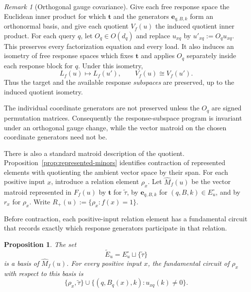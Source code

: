 \documentclass[11pt]{article}
\numberwithin{equation}{section}
\newtheorem{proposition}[definition]{Proposition}
\theoremstyle{remark}
\newtheorem{remark}[definition]{Remark}
\begin{document}
\begin{remark}[Orthogonal gauge covariance]
\label{rem:quotient-gauge-covariance}
Give each free response space the Euclidean inner product for which
$\mathbf t$ and the generators $\mathbf e_{q,B,k}$ form an orthonormal basis,
and give each quotient $V_f(u)$ the induced quotient inner product. For each
query $q$, let $O_q\in O(d_q)$ and replace
$u_{xq}$ by $u'_{xq}:=O_qu_{xq}$. This preserves every factorization
equation and every load. It also induces an isometry of free response
spaces which fixes $\mathbf t$ and applies $O_q$ separately inside each
response block for $q$. Under this isometry,
\begin{equation}
    L_f(u)\longmapsto L_f(u'),
    \qquad
    V_f(u)\cong V_f(u').
\end{equation}
Thus the target and the available response \emph{subspaces} are preserved,
up to the induced quotient isometry.

The individual coordinate generators are not preserved unless the $O_q$
are signed permutation matrices. Consequently the response-subspace program
is invariant under an orthogonal gauge change, while the vector matroid on
the chosen coordinate generators need not be.
\end{remark}

There is also a standard matroid description of the quotient.
Proposition~\ref{prop:represented-minors} identifies contraction of represented
elements with quotienting the ambient vector space by their span. For each
positive input $x$, introduce a relation element $\rho_x$. Let
$\widehat M_f(u)$ be the vector matroid represented in $F_f(u)$ by
$\mathbf t$ for $\widetilde\tau$, by $\mathbf e_{q,B,k}$ for
$(q,B,k)\in E_u^\circ$, and by $r_x$ for $\rho_x$. Write
$R_+(u):=\{\rho_x:f(x)=1\}$.

Before contraction, each positive-input relation element has a fundamental
circuit that records exactly which response generators participate in that
relation.

\begin{proposition}
\label{prop:relation-fundamental-circuits}
The set
\begin{equation}
    \widetilde E_u
    =
    E_u^\circ\sqcup\{\widetilde\tau\}
\end{equation}
is a basis of $\widehat M_f(u)$. For every positive input $x$, the
fundamental circuit of $\rho_x$ with respect to this basis is
\begin{equation}
    \{\rho_x,\widetilde\tau\}
    \cup
    \{
        (q,B_q(x),k):u_{xq}(k)\neq0
    \}.
\end{equation}
\end{proposition}
\end{document}
